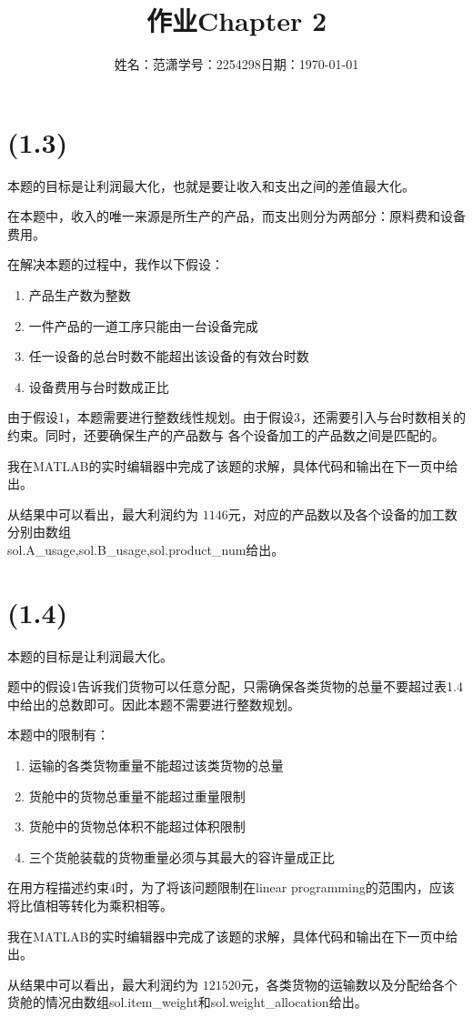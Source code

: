 \documentclass[a4paper]{article}
\title{作业{\hspace{1ex}}Chapter 2}
\author{姓名：范潇{\quad}学号：2254298{\quad}日期：\today}
\date{}
\begin{document}
\maketitle
\section{(1.3)}
本题的目标是让利润最大化，也就是要让收入和支出之间的差值最大化。

在本题中，收入的唯一来源是所生产的产品，而支出则分为两部分：原料费和设备费用。

在解决本题的过程中，我作以下假设：
\begin{enumerate}
    \item 产品生产数为整数
    \item 一件产品的一道工序只能由一台设备完成
    \item 任一设备的总台时数不能超出该设备的有效台时数
    \item 设备费用与台时数成正比
\end{enumerate}

由于假设1，本题需要进行整数线性规划。由于假设3，还需要引入与台时数相关的约束。同时，还要确保生产的产品数与
各个设备加工的产品数之间是匹配的。

我在MATLAB的实时编辑器中完成了该题的求解，具体代码和输出在下一页中给出。

从结果中可以看出，最大利润约为 $1146$元，对应的产品数以及各个设备的加工数分别由数组\\sol.A\_usage,sol.B\_usage,sol.product\_num给出。
\newpage 
\section{(1.4)}
本题的目标是让利润最大化。

题中的假设1告诉我们货物可以任意分配，只需确保各类货物的总量不要超过表1.4中给出的总数即可。因此本题不需要进行整数规划。

本题中的限制有：
\begin{enumerate}
    \item 运输的各类货物重量不能超过该类货物的总量
    \item 货舱中的货物总重量不能超过重量限制
    \item 货舱中的货物总体积不能超过体积限制
    \item 三个货舱装载的货物重量必须与其最大的容许量成正比
\end{enumerate}
在用方程描述约束4时，为了将该问题限制在linear programming的范围内，应该将比值相等转化为乘积相等。

我在MATLAB的实时编辑器中完成了该题的求解，具体代码和输出在下一页中给出。

从结果中可以看出，最大利润约为 $121520$元，各类货物的运输数以及分配给各个货舱的情况由数组sol.item\_weight和sol.weight\_allocation给出。
\end{document}
